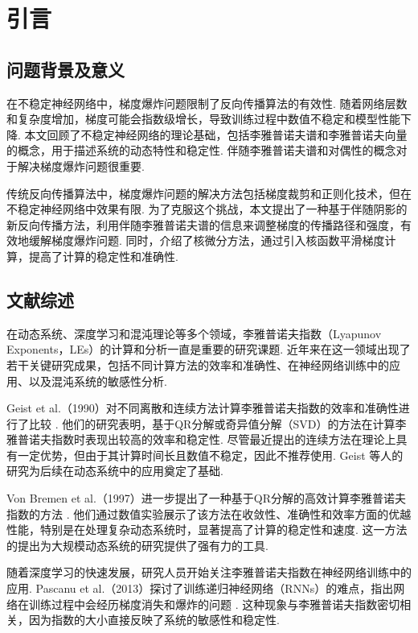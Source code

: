 
\chapter{引言}

\section{问题背景及意义}

在不稳定神经网络中，梯度爆炸问题限制了反向传播算法的有效性. 随着网络层数和复杂度增加，梯度可能会指数级增长，导致训练过程中数值不稳定和模型性能下降. 本文回顾了不稳定神经网络的理论基础，包括李雅普诺夫谱和李雅普诺夫向量的概念，用于描述系统的动态特性和稳定性. 伴随李雅普诺夫谱和对偶性的概念对于解决梯度爆炸问题很重要. 

传统反向传播算法中，梯度爆炸问题的解决方法包括梯度裁剪和正则化技术，但在不稳定神经网络中效果有限. 为了克服这个挑战，本文提出了一种基于伴随阴影的新反向传播方法，利用伴随李雅普诺夫谱的信息来调整梯度的传播路径和强度，有效地缓解梯度爆炸问题. 同时，介绍了核微分方法，通过引入核函数平滑梯度计算，提高了计算的稳定性和准确性. 

\section{文献综述}

在动态系统、深度学习和混沌理论等多个领域，李雅普诺夫指数（Lyapunov Exponents，LEs）的计算和分析一直是重要的研究课题. 近年来在这一领域出现了若干关键研究成果，包括不同计算方法的效率和准确性、在神经网络训练中的应用、以及混沌系统的敏感性分析. 

Geist et al.（1990）对不同离散和连续方法计算李雅普诺夫指数的效率和准确性进行了比较 \cite{Geist1990}. 他们的研究表明，基于QR分解或奇异值分解（SVD）的方法在计算李雅普诺夫指数时表现出较高的效率和稳定性. 尽管最近提出的连续方法在理论上具有一定优势，但由于其计算时间长且数值不稳定，因此不推荐使用. Geist 等人的研究为后续在动态系统中的应用奠定了基础. 

Von Bremen et al.（1997）进一步提出了一种基于QR分解的高效计算李雅普诺夫指数的方法 \cite{VONBREMEN19971}. 他们通过数值实验展示了该方法在收敛性、准确性和效率方面的优越性能，特别是在处理复杂动态系统时，显著提高了计算的稳定性和速度. 这一方法的提出为大规模动态系统的研究提供了强有力的工具. 

随着深度学习的快速发展，研究人员开始关注李雅普诺夫指数在神经网络训练中的应用. Pascanu et al.（2013）探讨了训练递归神经网络（RNNs）的难点，指出网络在训练过程中会经历梯度消失和爆炸的问题 \cite{pascanu2013difficulty}. 这种现象与李雅普诺夫指数密切相关，因为指数的大小直接反映了系统的敏感性和稳定性. 

